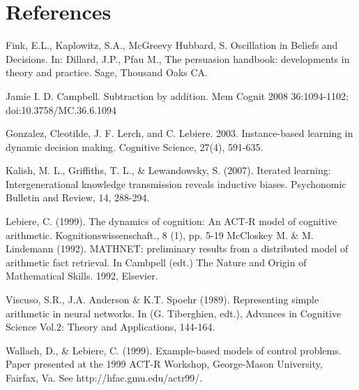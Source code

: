 \documentclass[twocolumn]{article}
\begin{document}
\section*{References}

Fink, E.L., Kaplowitz, S.A., McGreevy Hubbard, S. Oscillation in Beliefs and Decisions. In: Dillard, J.P., Pfau M., The persuasion handbook: developments in theory and practice. Sage, Thousand Oaks CA.

Jamie I. D. Campbell. Subtraction by addition. Mem Cognit 2008 36:1094-1102; doi:10.3758/MC.36.6.1094

Gonzalez, Cleotilde, J. F. Lerch, and C. Lebiere. 2003. Instance-based learning in dynamic decision making. Cognitive Science, 27(4), 591-635. 

Kalish, M. L., Griffiths, T. L., \& Lewandowsky, S. (2007). Iterated learning: Intergenerational knowledge transmission reveals inductive biases. Psychonomic Bulletin and Review, 14, 288-294.

Lebiere, C. (1999). The dynamics of cognition: An ACT-R model of cognitive arithmetic. Kognitionswissenschaft., 8 (1), pp. 5-19
McCloskey M. \& M. Lindemann (1992). MATHNET: preliminary results from a distributed model of arithmetic fact 
retrieval. In Cambpell (edt.) The Nature and Origin of Mathematical Skills. 1992, Elsevier. 

Viscuso, S.R., J.A. Anderson \& K.T. Spoehr (1989). Representing simple arithmetic in neural networks. In (G. 
Tiberghien, edt.), Advances in Cognitive Science Vol.2: Theory and Applications, 144-164. 

Wallach, D., \& Lebiere, C. (1999). Example-based models of control problems. Paper presented at the 1999 ACT-R Workshop, George-Mason University, Fairfax, Va. See http://hfac.gmu.edu/actr99/.







\end{document}

